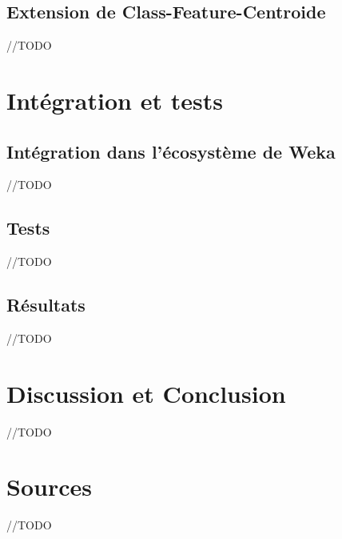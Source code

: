 \documentclass{article}
\begin{document}
\subsection{Extension de Class-Feature-Centroide }
//TODO



\section{Intégration et tests}
\subsection{Intégration dans l'écosystème de Weka}
//TODO
\subsection{Tests}
//TODO
\subsection{Résultats}
//TODO



\section{Discussion et Conclusion }
//TODO

\newpage
\section{Sources}
//TODO

\end{document}
